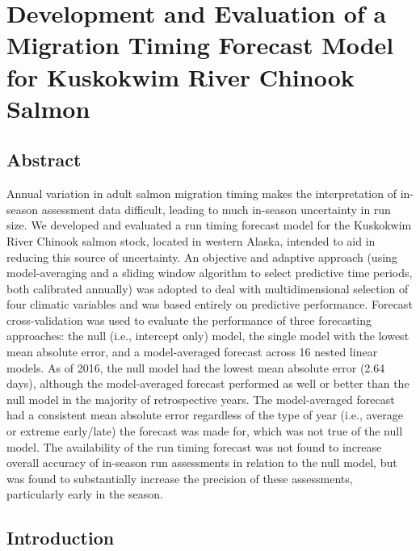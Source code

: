 \documentclass[12pt,]{book}
\theoremstyle{definition}
\theoremstyle{definition}
\theoremstyle{definition}
\theoremstyle{remark}
\begin{document}
\chapter{Development and Evaluation of a Migration Timing Forecast Model
for Kuskokwim River Chinook Salmon}\label{ch2}

\section*{Abstract}\label{abstract}

Annual variation in adult salmon migration timing makes the
interpretation of in-season assessment data difficult, leading to much
in-season uncertainty in run size. We developed and evaluated a run
timing forecast model for the Kuskokwim River Chinook salmon stock,
located in western Alaska, intended to aid in reducing this source of
uncertainty. An objective and adaptive approach (using model-averaging
and a sliding window algorithm to select predictive time periods, both
calibrated annually) was adopted to deal with multidimensional selection
of four climatic variables and was based entirely on predictive
performance. Forecast cross-validation was used to evaluate the
performance of three forecasting approaches: the null (i.e., intercept
only) model, the single model with the lowest mean absolute error, and a
model-averaged forecast across 16 nested linear models. As of 2016, the
null model had the lowest mean absolute error (2.64 days), although the
model-averaged forecast performed as well or better than the null model
in the majority of retrospective years. The model-averaged forecast had
a consistent mean absolute error regardless of the type of year (i.e.,
average or extreme early/late) the forecast was made for, which was not
true of the null model. The availability of the run timing forecast was
not found to increase overall accuracy of in-season run assessments in
relation to the null model, but was found to substantially increase the
precision of these assessments, particularly early in the season.

\section{Introduction}\label{introduction}
\end{document}
